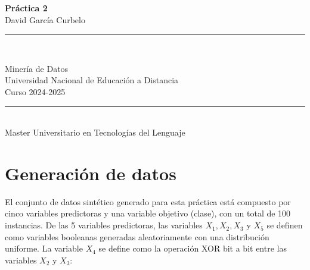 \documentclass[a4paper,12pt]{article}
\begin{document}
\begin{titlepage}
    \centering
    \vspace*{1cm}

    {\Huge \textbf{Práctica 2}} \\[0.5cm]
    {\Large {David García Curbelo}}

    \vspace*{1cm}
    \rule{0.05\linewidth}{0.3mm} \\[0.4cm]
    \vspace*{1cm}

    \begin{large}
        Minería de Datos \\[0.2cm]
        Universidad Nacional de Educación a Distancia \\[0.5cm]
        Curso 2024-2025
    \end{large}

    \vfill

    \begin{minipage}{0.8\textwidth}
        \centering
        \vspace{0.5cm}
        \rule{0.9\linewidth}{0.3mm} \\[0.4cm]
        Master Universitario en Tecnologías del Lenguaje
    \end{minipage}
\end{titlepage}

\newpage
\tableofcontents
\newpage




\section{Generación de datos}


El conjunto de datos sintético generado para esta práctica está compuesto por cinco variables predictoras y una variable objetivo (clase), con un total de 100 instancias. De las 5 variables predictoras, las variables \(X_1, X_2, X_3\) y \(X_5\) se definen como variables booleanas generadas aleatoriamente con una distribución uniforme. La variable \(X_4\) se define como la operación XOR bit a bit entre las variables \(X_2\) y \(X_3\):
\end{document}
